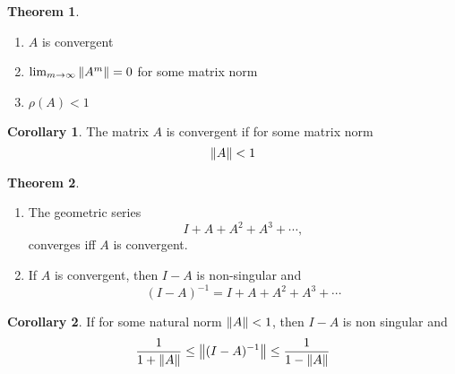 \documentclass[11pt,letterpaper]{article}
\numberwithin{figure}{section} %
\newcommand{\inv}[1]{#1^{-1}}
\theoremstyle{definition}
\newtheorem{theorem}{Theorem}[subsection]
\theoremstyle{definition}
\theoremstyle{definition}
\theoremstyle{definition}
\newtheorem*{corollary}{Corollary}
\theoremstyle{remark}
\theoremstyle{remark}
\theoremstyle{definition}
\theoremstyle{remark}
\theoremstyle{remark}
\begin{document}
\begin{multicols*}{3}
\begin{theorem}
\begin{enumerate}[label={(\alph*)}]
		\item $A$ is convergent
		\item $\lim_{m \to \infty} \norm{A^m} = 0$ for some matrix norm
		\item $\rho(A) < 1$
	\end{enumerate}
\end{theorem}
\begin{corollary}
	The matrix $A$ is convergent if for some matrix norm 
	\[
		\norm{A} < 1
	\]
\end{corollary}
\begin{theorem}
	\begin{enumerate}[label={(\alph*)}]
		\item
			The geometric series
			\[
				I + A + A^2 + A^3 + \cdots,
			\]
			converges iff $A$ is convergent.
		\item
			If $A$ is convergent, then $I - A$ is non-singular and
			\[
				\inv{(I - A)} = I + A + A^2 + A^3 + \cdots
			\]
	\end{enumerate}
\end{theorem}
\begin{corollary}
	If for some natural norm $\norm{A} < 1$, then $I - A$ is non singular and
	\[
		\frac{1}{1 + \norm{A}} \leq \norm{\inv{(I - A)}} \leq \frac{1}{1 - \norm{A}}
	\]
\end{corollary}

\end{multicols*}
\end{document}

